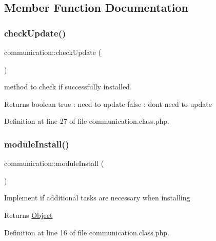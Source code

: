\subsection{Member Function Documentation}
\mbox{\label{classcommunication_a76f080661ce31bd72c02bb41c8d5714f}} 
\subsubsection{\texorpdfstring{check\+Update()}{checkUpdate()}}
{\footnotesize\ttfamily communication\+::check\+Update (\begin{DoxyParamCaption}{ }\end{DoxyParamCaption})}

method to check if successfully installed. \begin{DoxyReturn}{Returns}
boolean true \+: need to update false \+: don\textquotesingle{}t need to update 
\end{DoxyReturn}


Definition at line 27 of file communication.\+class.\+php.

\mbox{\label{classcommunication_aa976c35c62e0e28be160893825f4e7a6}} 
\subsubsection{\texorpdfstring{module\+Install()}{moduleInstall()}}
{\footnotesize\ttfamily communication\+::module\+Install (\begin{DoxyParamCaption}{ }\end{DoxyParamCaption})}

Implement if additional tasks are necessary when installing \begin{DoxyReturn}{Returns}
\hyperlink{classObject}{Object} 
\end{DoxyReturn}


Definition at line 16 of file communication.\+class.\+php.

\mbox{\label{classcommunication_a10cbff2a979531d279954a22b8455061}} 
